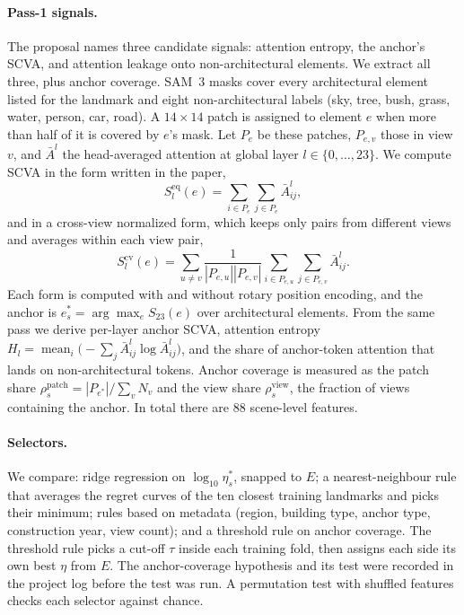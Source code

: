 \documentclass[sigconf,nonacm]{acmart}
\begin{document}
\paragraph{Pass-1 signals.} The proposal names three candidate signals: attention entropy, the anchor's SCVA, and attention leakage onto non-architectural elements. We extract all three, plus anchor coverage. SAM~3 masks cover every architectural element listed for the landmark and eight non-architectural labels (sky, tree, bush, grass, water, person, car, road). A $14{\times}14$ patch is assigned to element $e$ when more than half of it is covered by $e$'s mask. Let $P_e$ be these patches, $P_{e,v}$ those in view $v$, and $\bar A^l$ the head-averaged attention at global layer $l\in\{0,\ldots,23\}$. We compute SCVA in the form written in the paper,
\begin{equation}
S^{\mathrm{eq}}_l(e)=\sum_{i\in P_e}\sum_{j\in P_e}\bar A^l_{ij},
\end{equation}
and in a cross-view normalized form, which keeps only pairs from different views and averages within each view pair,
\begin{equation}
S^{\mathrm{cv}}_l(e)=\sum_{u\neq v}\frac{1}{|P_{e,u}||P_{e,v}|}\sum_{i\in P_{e,u}}\sum_{j\in P_{e,v}}\bar A^l_{ij}.
\end{equation}
Each form is computed with and without rotary position encoding, and the anchor is $e_s^*=\arg\max_e S_{23}(e)$ over architectural elements. From the same pass we derive per-layer anchor SCVA, attention entropy $H_l=\operatorname{mean}_i\bigl(-\sum_j\bar A^l_{ij}\log\bar A^l_{ij}\bigr)$, and the share of anchor-token attention that lands on non-architectural tokens. Anchor coverage is measured as the patch share $\rho^{\mathrm{patch}}_s=|P_{e^*}|/\sum_v N_v$ and the view share $\rho^{\mathrm{view}}_s$, the fraction of views containing the anchor. In total there are 88 scene-level features.

\paragraph{Selectors.} We compare: ridge regression on $\log_{10}\eta^*_s$, snapped to $E$; a nearest-neighbour rule that averages the regret curves of the ten closest training landmarks and picks their minimum; rules based on metadata (region, building type, anchor type, construction year, view count); and a threshold rule on anchor coverage. The threshold rule picks a cut-off $\tau$ inside each training fold, then assigns each side its own best $\eta$ from $E$. The anchor-coverage hypothesis and its test were recorded in the project log before the test was run. A permutation test with shuffled features checks each selector against chance.
\end{document}
